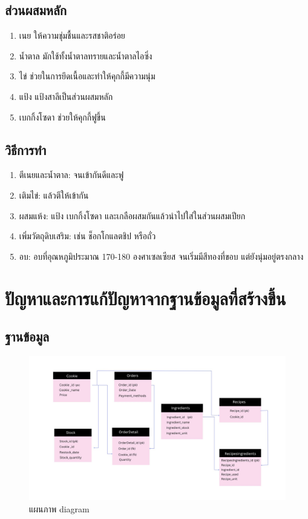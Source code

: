 \documentclass{report}
\begin{document}
\section{ส่วนผสมหลัก} \par
\begin{enumerate}
	\item เนย ให้ความชุ่มชื้นและรสชาติอร่อย
	\item น้ำตาล มักใช้ทั้งน้ำตาลทรายและน้ำตาลไอซิ่ง
	\item ไข่ ช่วยในการยึดเนื้อและทำให้คุกกี้มีความนุ่ม
	\item แป้ง แป้งสาลีเป็นส่วนผสมหลัก
	\item เบกกิ้งโซดา ช่วยให้คุกกี้ฟูขึ้น
\end{enumerate}
\section{วิธีการทำ} \par
\begin{enumerate}
	\item ตีเนยและน้ำตาล: จนเข้ากันดีและฟู
	\item เติมไข่: แล้วตีให้เข้ากัน
	\item ผสมแห้ง: แป้ง เบกกิ้งโซดา และเกลือผสมกันแล้วนำไปใส่ในส่วนผสมเปียก
	\item เพิ่มวัตถุดิบเสริม: เช่น ช็อกโกแลตชิป หรือถั่ว
	\item อบ: อบที่อุณหภูมิประมาณ 170-180 องศาเซลเซียส จนเริ่มมีสีทองที่ขอบ แต่ยังนุ่มอยู่ตรงกลาง
\end{enumerate}

\chapter{ปัญหาและการแก้ปัญหาจากฐานข้อมูลที่สร้างขึ้น}

\section{ฐานข้อมูล}
\begin{figure}[!ht]
	\centering
	\includegraphics[scale=0.3]{Menu.jpg}
	\caption{แผนภาพ diagram}
	\label{fig : graph2}
\end{figure}
\end{document}
